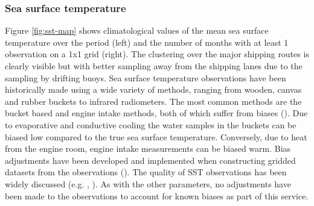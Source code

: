 \subsubsection{Sea surface temperature}
Figure \ref{fig:sst-map} shows climatological values of the mean sea surface temperature over the period \datatimerange{} (left) and the number of months with at least 1 observation on a 1x1 grid (right).
The clustering over the major shipping routes is clearly visible but with better sampling away from the shipping lanes due to the sampling by drifting buoys.
Sea surface temperature observations have been historically made using a wide variety of methods, ranging from wooden, canvas and rubber buckets to infrared radiometers. 
The most common methods are the bucket based and engine intake methods, both of which suffer from biases (\cite{Kent2017}). 
Due to evaporative and conductive cooling the water samples in the buckets can be biased low compared to the true sea surface temperature. 
Conversely, due to heat from the engine room, engine intake measurements can be biased warm. 
Bias adjustments have been developed and implemented when constructing gridded datasets from the observations (\cite{Kennedy2011_part2}). 
The quality of SST observations has been widely discussed (e.g. \cite{Kennedy2014}, \cite{Kent2017}).
As with the other parameters, no adjustments have been made to the observations to account for known biases as part of this service.

